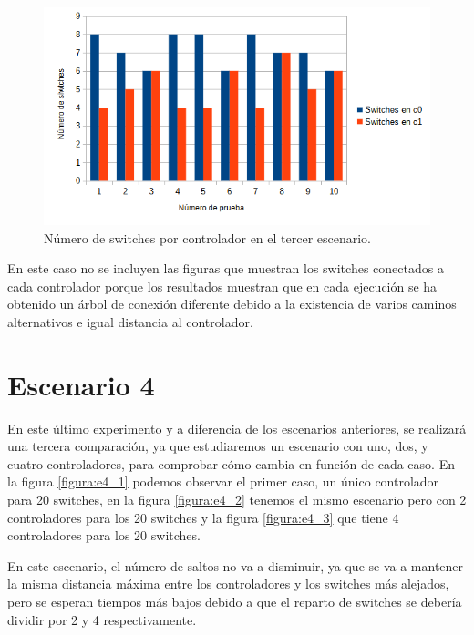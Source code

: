\documentclass[a4paper, 12pt]{book}
\begin{document}
 	
 	\begin{figure}[H]
 		\centering
 		\includegraphics[width=14cm, keepaspectratio]{img/switchesporcontrollerescenario3}
 		\caption{Número de switches por controlador en el tercer escenario.}
 		\label{figura:switchesporcontrollerb4}
 	\end{figure}
 	
 	En este caso no se incluyen las figuras que muestran los switches conectados a cada controlador porque los resultados muestran que en cada ejecución se ha obtenido un árbol de conexión diferente debido a la existencia de varios caminos alternativos e igual distancia al controlador.
	
	\clearpage
	\section{Escenario 4}
	
	En este último experimento y a diferencia de los escenarios anteriores, se realizará una tercera comparación, ya que estudiaremos un escenario con uno, dos, y cuatro controladores, para comprobar cómo cambia en función de cada caso.
	En la figura \ref{figura:e4_1} podemos observar el primer caso, un único controlador para 20 switches, en la figura \ref{figura:e4_2} tenemos el mismo escenario pero con 2 controladores para los 20 switches y la figura \ref{figura:e4_3} que  tiene 4 controladores para los 20 switches.
	
	En este escenario, el número de saltos no va a disminuir, ya que se va a mantener la misma distancia máxima entre los controladores y los switches más alejados, pero se esperan tiempos más bajos debido a que el reparto de switches se debería dividir por 2 y 4 respectivamente.
	
\end{document}
